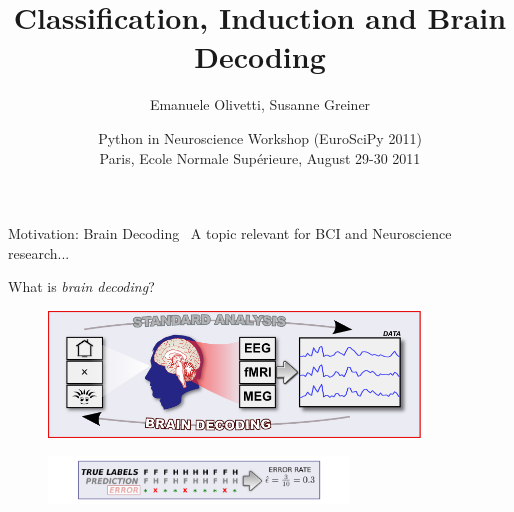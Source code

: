 \documentclass{beamer}
\title[Classification, Induction and Brain Decoding]
{Classification, Induction and Brain Decoding}
\author[E.Olivetti, S.Greiner]
{Emanuele Olivetti, \alert{Susanne Greiner}}
\institute[FBK/CIMeC]
{
  NeuroInformatics Laboratory (NILab)\\
  Bruno Kessler Foundation, Trento (FBK), Italy\\
  Center for Mind and Brain Sciences (CIMeC),
  University of Trento, Italy\\
  \url{http://nilab.fbk.eu}\\
  \url{olivetti@fbk.eu}\\
  \url{greiner@fbk.eu}}
\date[PIN2011] %
{Python in Neuroscience Workshop (EuroSciPy 2011)\\
Paris, Ecole Normale Sup\'erieure, August 29-30 2011}
\begin{document}
\begin{frame}
  \titlepage
\end{frame}


\begin{frame}{Motivation: Brain Decoding~\cite{haynes2006decoding}}
A topic relevant for BCI and Neuroscience research...
  \begin{block}{What is \emph{brain decoding}?}
  \end{block}
\begin{figure}
    \centering
    \includegraphics[width=10cm]{brain_decoding}
    \label{fig:brain_decoding}
  \end{figure}

\begin{figure}
    \centering
    \includegraphics[width=8cm]{prediction}
    \label{fig:prediction_I}
  \end{figure}


\end{frame}
\end{document}
